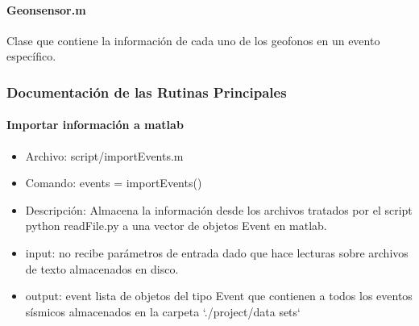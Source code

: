 \paragraph{Geonsensor.m}
Clase que contiene la información de cada uno de los geofonos en un evento
específico. 
\subsubsection{Documentación de las Rutinas Principales}

\paragraph{Importar información a matlab}
\begin{itemize}
  \item Archivo: script/importEvents.m
  \item Comando: events = importEvents()
  \item Descripción: Almacena la información desde los archivos tratados por el
  script python readFile.py a una vector de objetos Event en matlab.
  \item input: no recibe parámetros de entrada dado que hace lecturas sobre
  archivos de texto almacenados en disco.
  \item output: event lista de objetos del tipo Event que contienen a todos los
  eventos sísmicos almacenados en la carpeta `./project/data sets`  		 
\end{itemize}



